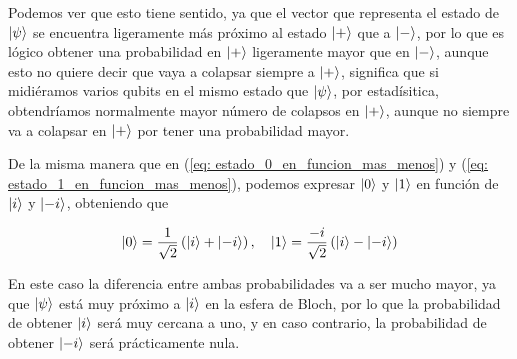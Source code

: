 \documentclass[12pt]{article}
\numberwithin{equation}{section} %
\begin{document}
    \vspace{10mm}

    Podemos ver que esto tiene sentido, ya que el vector que representa el estado de \( \ket{\psi} \) se encuentra ligeramente más próximo al estado \( \ket{+} \) que a \( \ket{-} \), por lo que es lógico obtener una probabilidad en \( \ket{+} \) ligeramente mayor que en \( \ket{-} \), aunque esto no quiere decir que vaya a colapsar siempre a \( \ket{+} \), significa que si midiéramos varios qubits en el mismo estado que \( \ket{\psi} \), por estadísitica, obtendríamos normalmente mayor número de colapsos en \( \ket{+} \), aunque no siempre va a colapsar en \( \ket{+} \) por tener una probabilidad mayor.

    \vspace{5mm}

    De la misma manera que en (\ref{eq: estado_0_en_funcion_mas_menos}) y (\ref{eq: estado_1_en_funcion_mas_menos}), podemos expresar \( \ket{0} \) y \( \ket{1} \) en función de \( \ket{i} \) y \( \ket{-i} \), obteniendo que

    \begin{equation}
        \ket{0} = \frac{1}{\sqrt{2}} \left( \ket{i} + \ket{-i} \right), \quad \ket{1} = \frac{-i}{\sqrt{2}} \left( \ket{i} - \ket{-i} \right) 
        \label{eq: estado_0_y_1_en_funcion_i_menosi}
    \end{equation}

    \vspace{5mm}

    En este caso la diferencia entre ambas probabilidades va a ser mucho mayor, ya que \( \ket{\psi} \) está muy próximo a \( \ket{i} \) en la esfera de Bloch, por lo que la probabilidad de obtener \( \ket{i} \) será muy cercana a uno, y en caso contrario, la probabilidad de obtener \( \ket{-i} \) será prácticamente nula.
\end{document}
